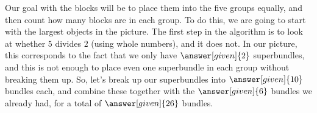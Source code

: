 \documentclass{ximera}
\begin{document}
\begin{example}
\begin{image}
\end{image}

\begin{image}
\end{image}

Our goal with the blocks will be to place them into the five groups equally, and then count how many blocks are in each group. To do this, we are going to start with the largest objects in the picture. The first step in the algorithm is to look at whether $5$ divides $2$ (using whole numbers), and it does not. In our picture, this corresponds to the fact that we only have $\answer[given]{2}$ superbundles, and this is not enough to place even one superbundle in each group without breaking them up. So, let's break up our superbundles into $\answer[given]{10}$ bundles each, and combine these together with the $\answer[given]{6}$ bundles we already had, for a total of $\answer[given]{26}$ bundles.


\end{example}
\end{document}
